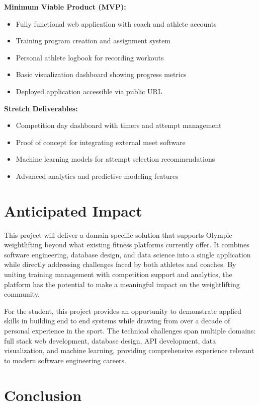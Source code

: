 \documentclass[11pt, oneside]{article}   	%
\begin{document}
\textbf{Minimum Viable Product (MVP):}
\begin{itemize}
    \item Fully functional web application with coach and athlete accounts
    \item Training program creation and assignment system
    \item Personal athlete logbook for recording workouts
    \item Basic visualization dashboard showing progress metrics
    \item Deployed application accessible via public URL
\end{itemize}

\textbf{Stretch Deliverables:}
\begin{itemize}
    \item Competition day dashboard with timers and attempt management
    \item Proof of concept for integrating external meet software
    \item Machine learning models for attempt selection recommendations
    \item Advanced analytics and predictive modeling features
\end{itemize}

\section*{Anticipated Impact}

This project will deliver a domain specific solution that supports Olympic weightlifting beyond what existing fitness platforms currently offer. It combines software engineering, database design, and data science into a single application while directly addressing challenges faced by both athletes and coaches. By uniting training management with competition support and analytics, the platform has the potential to make a meaningful impact on the weightlifting community.

For the student, this project provides an opportunity to demonstrate applied skills in building end to end systems while drawing from over a decade of personal experience in the sport. The technical challenges span multiple domains: full stack web development, database design, API development, data visualization, and machine learning, providing comprehensive experience relevant to modern software engineering careers.

\section*{Conclusion}
\end{document}
